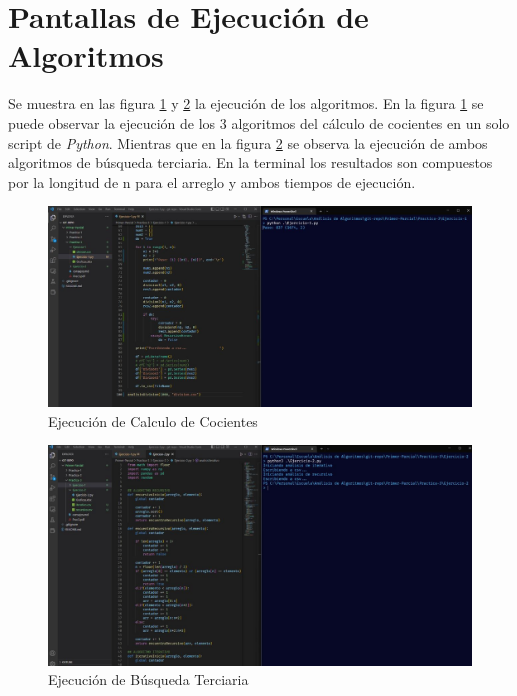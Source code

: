     \section{Pantallas de Ejecución de Algoritmos}
    Se muestra en las figura \ref{fig:cocientes} y \ref{fig:busq} la ejecución de los algoritmos. 
    En la figura \ref{fig:cocientes}  se puede observar la ejecución de los 3 algoritmos del cálculo de cocientes en un solo script de \textit{Python}. 
    Mientras que en la figura \ref{fig:busq} se observa la ejecución de ambos algoritmos de búsqueda terciaria. En la terminal los resultados son compuestos por la longitud de n para el arreglo y ambos tiempos de ejecución. 
    
        \begin{figure}[htp!]
            \centering
            \includegraphics[width=0.8 \textwidth]{Images/Pantallas/pantalla1.png}  
            \caption{Ejecución de Calculo de Cocientes}
            \label{fig:cocientes}
        \end{figure}
        
        \begin{figure}[htp!]
            \centering
            \includegraphics[width=0.8 \textwidth]{Images/Pantallas/pantalla2.png}  
            \caption{Ejecución de Búsqueda Terciaria}
            \label{fig:busq}
        \end{figure}
